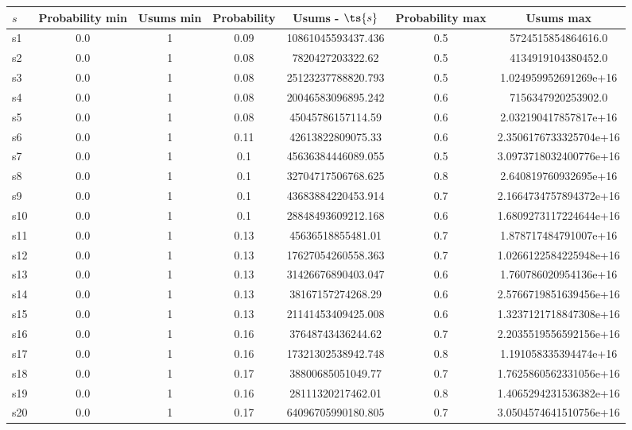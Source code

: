 \documentclass{article}
\begin{document}
\noindent\begin{tabular}{|l|c|c|c|c|c|c|}
\hline
$s$& Probability min & Usums min & Probability & Usums - $\ts{s}$ & Probability max & Usums max\\
\hline
s1 &0.0 & 1 & 0.09 & 10861045593437.436 & 0.5 & 5724515854864616.0\\
\hline
s2 &0.0 & 1 & 0.08 & 7820427203322.62 & 0.5 & 4134919104380452.0\\
\hline
s3 &0.0 & 1 & 0.08 & 25123237788820.793 & 0.5 & 1.024959952691269e+16\\
\hline
s4 &0.0 & 1 & 0.08 & 20046583096895.242 & 0.6 & 7156347920253902.0\\
\hline
s5 &0.0 & 1 & 0.08 & 45045786157114.59 & 0.6 & 2.032190417857817e+16\\
\hline
s6 &0.0 & 1 & 0.11 & 42613822809075.33 & 0.6 & 2.3506176733325704e+16\\
\hline
s7 &0.0 & 1 & 0.1 & 45636384446089.055 & 0.5 & 3.0973718032400776e+16\\
\hline
s8 &0.0 & 1 & 0.1 & 32704717506768.625 & 0.8 & 2.640819760932695e+16\\
\hline
s9 &0.0 & 1 & 0.1 & 43683884220453.914 & 0.7 & 2.1664734757894372e+16\\
\hline
s10 &0.0 & 1 & 0.1 & 28848493609212.168 & 0.6 & 1.6809273117224644e+16\\
\hline
s11 &0.0 & 1 & 0.13 & 45636518855481.01 & 0.7 & 1.878717484791007e+16\\
\hline
s12 &0.0 & 1 & 0.13 & 17627054260558.363 & 0.7 & 1.0266122584225948e+16\\
\hline
s13 &0.0 & 1 & 0.13 & 31426676890403.047 & 0.6 & 1.760786020954136e+16\\
\hline
s14 &0.0 & 1 & 0.13 & 38167157274268.29 & 0.6 & 2.5766719851639456e+16\\
\hline
s15 &0.0 & 1 & 0.13 & 21141453409425.008 & 0.6 & 1.3237121718847308e+16\\
\hline
s16 &0.0 & 1 & 0.16 & 37648743436244.62 & 0.7 & 2.2035519556592156e+16\\
\hline
s17 &0.0 & 1 & 0.16 & 17321302538942.748 & 0.8 & 1.191058335394474e+16\\
\hline
s18 &0.0 & 1 & 0.17 & 38800685051049.77 & 0.7 & 1.7625860562331056e+16\\
\hline
s19 &0.0 & 1 & 0.16 & 28111320217462.01 & 0.8 & 1.4065294231536382e+16\\
\hline
s20 &0.0 & 1 & 0.17 & 64096705990180.805 & 0.7 & 3.0504574641510756e+16\\

\end{tabular}
\end{document}

